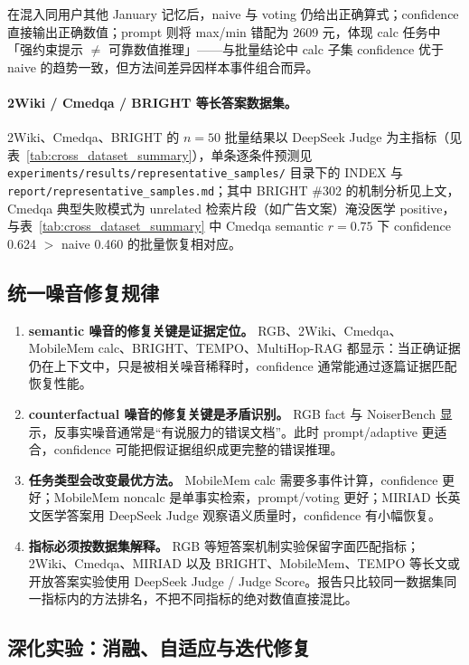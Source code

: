 \documentclass[UTF8,zihao=-4]{ctexart}
\begin{document}
在混入同用户其他 January 记忆后，naive 与 voting 仍给出正确算式；confidence 直接输出正确数值；prompt 则将 max/min 错配为 2609 元，体现 calc 任务中「强约束提示 $\neq$ 可靠数值推理」——与批量结论中 calc 子集 confidence 优于 naive 的趋势一致，但方法间差异因样本事件组合而异。

\paragraph{2Wiki / Cmedqa / BRIGHT 等长答案数据集。}
2Wiki、Cmedqa、BRIGHT 的 $n=50$ 批量结果以 DeepSeek Judge 为主指标（见表~\ref{tab:cross_dataset_summary}），单条逐条件预测见 \texttt{experiments/results/representative\_samples/} 目录下的 INDEX 与 \texttt{report/representative\_samples.md}；其中 BRIGHT \#302 的机制分析见上文，Cmedqa 典型失败模式为 unrelated 检索片段（如广告文案）淹没医学 positive，与表~\ref{tab:cross_dataset_summary} 中 Cmedqa semantic $r=0.75$ 下 confidence 0.624 $>$ naive 0.460 的批量恢复相对应。

\subsection{统一噪音修复规律}

\begin{enumerate}
  \item \textbf{semantic 噪音的修复关键是证据定位。} RGB、2Wiki、Cmedqa、MobileMem calc、BRIGHT、TEMPO、MultiHop-RAG 都显示：当正确证据仍在上下文中，只是被相关噪音稀释时，confidence 通常能通过逐篇证据匹配恢复性能。
  \item \textbf{counterfactual 噪音的修复关键是矛盾识别。} RGB fact 与 NoiserBench 显示，反事实噪音通常是“有说服力的错误文档”。此时 prompt/adaptive 更适合，confidence 可能把假证据组织成更完整的错误推理。
  \item \textbf{任务类型会改变最优方法。} MobileMem calc 需要多事件计算，confidence 更好；MobileMem noncalc 是单事实检索，prompt/voting 更好；MIRIAD 长英文医学答案用 DeepSeek Judge 观察语义质量时，confidence 有小幅恢复。
  \item \textbf{指标必须按数据集解释。} RGB 等短答案机制实验保留字面匹配指标；2Wiki、Cmedqa、MIRIAD 以及 BRIGHT、MobileMem、TEMPO 等长文或开放答案实验使用 DeepSeek Judge / Judge Score。报告只比较同一数据集同一指标内的方法排名，不把不同指标的绝对数值直接混比。
\end{enumerate}

\subsection{深化实验：消融、自适应与迭代修复}
\end{document}
